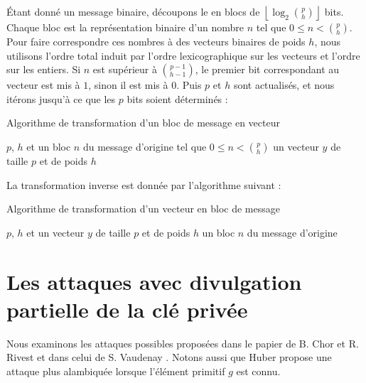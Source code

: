 \documentclass[a4paper, titlepage]{article}
\theoremstyle{definition}
\theoremstyle{remark}
\def\floor #1{\left\lfloor#1\right\rfloor}
\begin{document}
\'Etant donné un message binaire, découpons le en blocs de $\floor{\log_2\binom{p}{h}}$ bits. Chaque bloc est la représentation binaire d'un nombre $n$ tel que $0\leqslant n < \binom{p}{h}$. Pour faire correspondre ces nombres à des vecteurs binaires de poids $h$, nous utilisons l'ordre total induit par l'ordre lexicographique sur les vecteurs et l'ordre sur les entiers. Si $n$ est supérieur à $\binom{p-1}{h-1}$, le premier bit correspondant au vecteur est mis à $1$, sinon il est mis à $0$. Puis $p$ et $h$ sont actualisés, et nous itérons jusqu'à ce que les $p$ bits soient déterminés :

\begin{algorithm}[h]
\caption{Algorithme de transformation d'un bloc de message en vecteur}
\begin{algorithmic}[1]
\REQUIRE $p$, $h$ et un bloc $n$ du message d'origine tel que $0\leqslant n < \binom{p}{h}$
\ENSURE un vecteur $y$ de taille $p$ et de poids $h$
	\ELSE
	\ENDIF
\ENDFOR
{}
\end{algorithmic}
\end{algorithm}

La transformation inverse est donnée par l'algorithme suivant :
\begin{algorithm}[h]
\caption{Algorithme de transformation d'un vecteur en bloc de message}
\begin{algorithmic}[1]
\REQUIRE $p$, $h$ et un vecteur $y$ de taille $p$ et de poids $h$
\ENSURE un bloc $n$ du message d'origine
	\ENDIF
\ENDFOR
{}
\end{algorithmic}
\end{algorithm}


\section{Les attaques avec divulgation partielle de la clé privée}

Nous examinons les attaques possibles proposées dans le papier de B. Chor et R. Rivest \cite[Section VII, A]{chorRivest1988} et dans celui de S. Vaudenay \cite[Section 4]{vaudenay2000}. Notons aussi que Huber \cite{huber1991} propose une attaque plus alambiquée lorsque l'élément primitif $g$ est connu.
\end{document}
